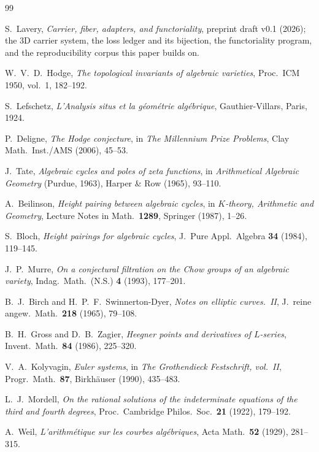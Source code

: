 \documentclass[11pt]{article}
\theoremstyle{definition}
\theoremstyle{remark}
\begin{document}
\begin{thebibliography}{99}

 S.~Lavery, \emph{Carrier, fiber, adapters, and
functoriality}, preprint draft v0.1 (2026); the 3D carrier system, the loss
ledger and its bijection, the functoriality program, and the reproducibility
corpus this paper builds on.

 W.~V.~D.~Hodge, \emph{The topological invariants of algebraic
varieties}, Proc.\ ICM 1950, vol.~1, 182--192.

 S.~Lefschetz, \emph{L'Analysis situs et la g\'eom\'etrie
alg\'ebrique}, Gauthier-Villars, Paris, 1924.

 P.~Deligne, \emph{The Hodge conjecture}, in \emph{The
Millennium Prize Problems}, Clay Math.\ Inst./AMS (2006), 45--53.

 J.~Tate, \emph{Algebraic cycles and poles of zeta
functions}, in \emph{Arithmetical Algebraic Geometry} (Purdue, 1963), Harper \&
Row (1965), 93--110.

 A.~Beilinson, \emph{Height pairing between algebraic
cycles}, in \emph{$K$-theory, Arithmetic and Geometry}, Lecture Notes in
Math.\ \textbf{1289}, Springer (1987), 1--26.

 S.~Bloch, \emph{Height pairings for algebraic cycles}, J.\
Pure Appl.\ Algebra \textbf{34} (1984), 119--145.

 J.~P.~Murre, \emph{On a conjectural filtration on the Chow
groups of an algebraic variety}, Indag.\ Math.\ (N.S.) \textbf{4} (1993),
177--201.

 B.~J.~Birch and H.~P.~F.~Swinnerton-Dyer, \emph{Notes on
elliptic curves.\ II}, J.\ reine angew.\ Math.\ \textbf{218} (1965), 79--108.

 B.~H.~Gross and D.~B.~Zagier, \emph{Heegner points and
derivatives of $L$-series}, Invent.\ Math.\ \textbf{84} (1986), 225--320.

 V.~A.~Kolyvagin, \emph{Euler systems}, in \emph{The
Grothendieck Festschrift, vol.~II}, Progr.\ Math.\ \textbf{87}, Birkh\"auser
(1990), 435--483.

 L.~J.~Mordell, \emph{On the rational solutions of the
indeterminate equations of the third and fourth degrees}, Proc.\ Cambridge
Philos.\ Soc.\ \textbf{21} (1922), 179--192.

 A.~Weil, \emph{L'arithm\'etique sur les courbes
alg\'ebriques}, Acta Math.\ \textbf{52} (1929), 281--315.


\end{thebibliography}
\end{document}
